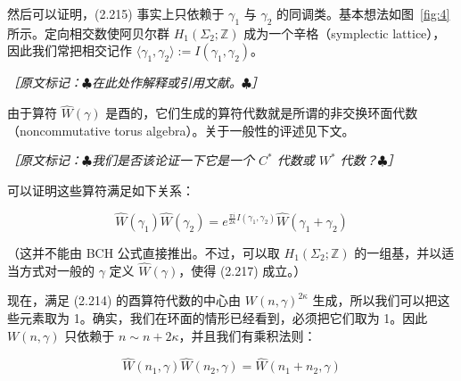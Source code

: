 然后可以证明，(2.215) 事实上只依赖于 $\gamma_1$ 与 $\gamma_2$ 的同调类。基本想法如图~\ref{fig:4} 所示。定向相交数使阿贝尔群 $H_1(\Sigma_2;\mathbb{Z})$ 成为一个辛格（symplectic lattice），因此我们常把相交记作 $\langle\gamma_1,\gamma_2\rangle:=I(\gamma_1,\gamma_2)$。

{\small\itshape ［原文标记：$\clubsuit$在此处作解释或引用文献。$\clubsuit$］}

由于算符 $\widehat{W}(\gamma)$ 是酉的，它们生成的算符代数就是所谓的非交换环面代数（noncommutative torus algebra）。关于一般性的评述见下文。

{\small\itshape ［原文标记：$\clubsuit$我们是否该论证一下它是一个 $C^*$ 代数或 $W^*$ 代数？$\clubsuit$］}

可以证明这些算符满足如下关系：

\begin{equation}
  \widehat{W}(\gamma_1)\widehat{W}(\gamma_2)
  =e^{\frac{\pi i}{2\kappa}I(\gamma_1,\gamma_2)}
  \widehat{W}(\gamma_1+\gamma_2)
  \tag{2.217}
  \label{eq:2.217}
\end{equation}

（这并不能由 BCH 公式直接推出。不过，可以取 $H_1(\Sigma_2;\mathbb{Z})$ 的一组基，并以适当方式对一般的 $\gamma$ 定义 $\widehat{W}(\gamma)$，使得 (2.217) 成立。）

现在，满足 (2.214) 的酉算符代数的中心由 $W(n,\gamma)^{2\kappa}$ 生成，所以我们可以把这些元素取为 1。确实，我们在环面的情形已经看到，必须把它们取为 1。因此 $W(n,\gamma)$ 只依赖于 $n\sim n+2\kappa$，并且我们有乘积法则：

\begin{equation}
  \widehat{W}(n_1,\gamma)\widehat{W}(n_2,\gamma)=\widehat{W}(n_1+n_2,\gamma)
  \tag{2.218}
  \label{eq:2.218}
\end{equation}

